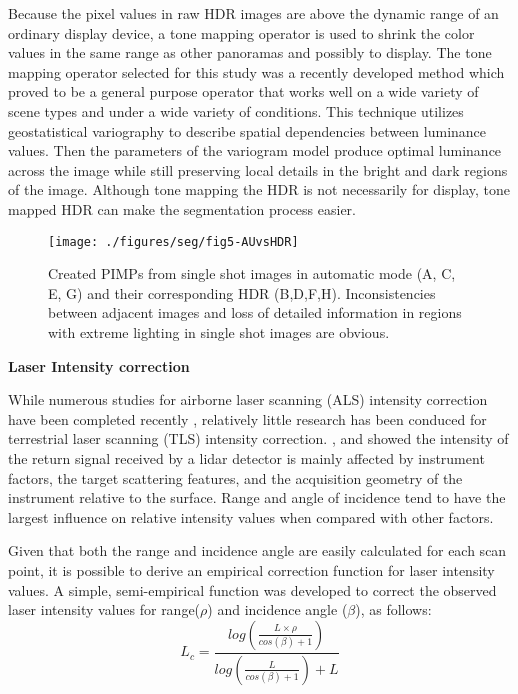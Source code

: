 \documentclass[final,3p,times,twocolumn,authoryear]{elsarticle}
\begin{document}
Because the pixel values in raw HDR images are above the dynamic range of an ordinary display device, a tone mapping operator is used to shrink the color values in the same range as other panoramas and possibly to display. The tone mapping operator selected for this study was a recently developed method \cite{TMO} which proved to be a general purpose operator that works well on a wide variety of scene types and under a wide variety of conditions.  This technique utilizes geostatistical variography to describe spatial dependencies between luminance values. Then the parameters of the variogram model produce optimal luminance across the image while still preserving local details in the bright and dark regions of the image. Although tone mapping the HDR is not necessarily for display, tone mapped HDR can make the segmentation process easier.


\begin{figure*}
	\centering
	\texttt{[image: ./figures/seg/fig5-AUvsHDR]}
	\caption{Created PIMPs from single shot images in automatic mode (A, C, E, G) and their corresponding HDR (B,D,F,H). Inconsistencies between adjacent images and loss of detailed information in regions with extreme lighting in single shot images are obvious.}
	\label{fig:fig5-AUvsHDR}
\end{figure*}

\noindent \textbf{Laser Intensity correction}

While numerous studies for airborne laser scanning (ALS) intensity correction have been completed recently \cite{ding2013,briese2012,vain2009}, relatively little research has been conduced for  terrestrial laser scanning (TLS) intensity correction. \cite{kaasalainen2009,kaasalainen2011,pfeifer2008}, and \cite{kashani2015} showed the intensity of the return signal received by a lidar detector is mainly affected by instrument factors, the target scattering features, and the acquisition geometry of the instrument relative to the surface. Range and angle of incidence tend to have the largest influence on relative intensity values when compared with other factors.  

Given that both the range and incidence angle are easily calculated for each scan point, it is possible to derive an empirical correction function for laser intensity values. A simple, semi-empirical function was developed to correct the observed laser intensity values for range($\rho$) and incidence angle ($\beta$), as follows:
\begin{equation}
L_c=\frac{log(\frac{L \times \rho}{cos(\beta )+1})}{log(\frac{L}{cos(\beta )+1})+L}
\end{equation}
\end{document}
